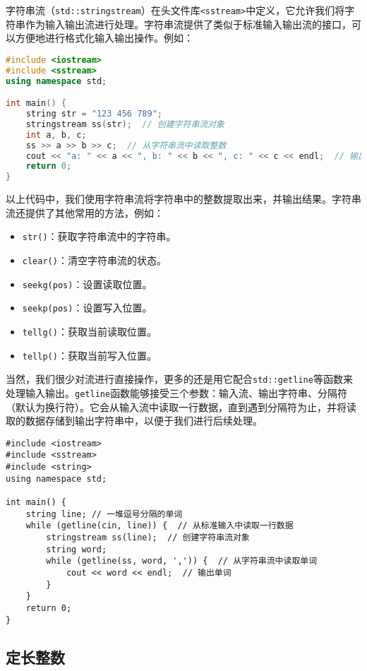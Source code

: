 \documentclass[../main.tex]{subfiles}
\begin{document}
字符串流（\texttt{std::stringstream}）在头文件库\texttt{<sstream>}中定义，它允许我们将字符串作为输入输出流进行处理。字符串流提供了类似于标准输入输出流的接口，可以方便地进行格式化输入输出操作。例如：
\begin{lstlisting}[language=C++]
#include <iostream>
#include <sstream>
using namespace std;

int main() {
    string str = "123 456 789";
    stringstream ss(str);  // 创建字符串流对象
    int a, b, c;
    ss >> a >> b >> c;  // 从字符串流中读取整数
    cout << "a: " << a << ", b: " << b << ", c: " << c << endl;  // 输出结果
    return 0;
}
\end{lstlisting}
以上代码中，我们使用字符串流将字符串中的整数提取出来，并输出结果。字符串流还提供了其他常用的方法，例如：
\begin{itemize}
  \item \texttt{str()}：获取字符串流中的字符串。
  \item \texttt{clear()}：清空字符串流的状态。
  \item \texttt{seekg(pos)}：设置读取位置。
  \item \texttt{seekp(pos)}：设置写入位置。
  \item \texttt{tellg()}：获取当前读取位置。
  \item \texttt{tellp()}：获取当前写入位置。
\end{itemize}
当然，我们很少对流进行直接操作，更多的还是用它配合\texttt{std::getline}等函数来处理输入输出。\texttt{getline}函数能够接受三个参数：输入流、输出字符串、分隔符（默认为换行符）。它会从输入流中读取一行数据，直到遇到分隔符为止，并将读取的数据存储到输出字符串中，以便于我们进行后续处理。
\begin{lstlisting}
#include <iostream>
#include <sstream>
#include <string>
using namespace std;

int main() {
    string line; // 一堆逗号分隔的单词
    while (getline(cin, line)) {  // 从标准输入中读取一行数据
        stringstream ss(line);  // 创建字符串流对象
        string word;
        while (getline(ss, word, ',')) {  // 从字符串流中读取单词
            cout << word << endl;  // 输出单词
        }
    }
    return 0;
}
\end{lstlisting}

\subsection{定长整数}
\end{document}
